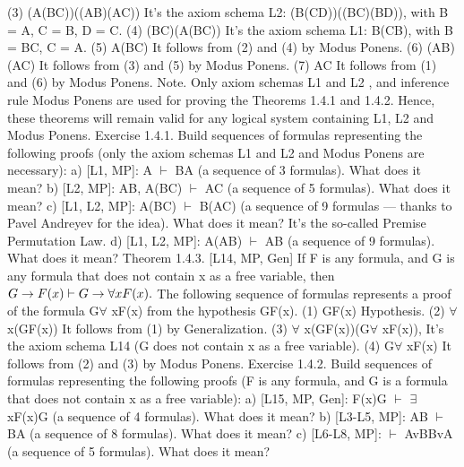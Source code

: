 (3) (A\IMPLIES (B\IMPLIES C))\IMPLIES ((A\IMPLIES B)\IMPLIES (A\IMPLIES C)) It's the axiom schema L2:
                                       (B\IMPLIES (C\IMPLIES D))\IMPLIES ((B\IMPLIES C)\IMPLIES (B\IMPLIES D)), with B =
                                                  A, C = B, D = C.
(4) (B\IMPLIES C)\IMPLIES (A\IMPLIES (B\IMPLIES C)) It's the axiom schema L1: B\IMPLIES (C\IMPLIES B), with B
                               = B\IMPLIES C, C = A.
(5) A\IMPLIES (B\IMPLIES C) It follows from (2) and (4) by Modus Ponens.
(6) (A\IMPLIES B)\IMPLIES (A\IMPLIES C) It follows from (3) and (5) by Modus Ponens.
(7) A\IMPLIES C It follows from (1) and (6) by Modus Ponens.
Note. Only axiom schemas L1 and L2 , and inference rule Modus Ponens are used for proving the
Theorems 1.4.1 and 1.4.2. Hence, these theorems will remain valid for any logical system containing
L1, L2 and Modus Ponens.
Exercise 1.4.1. Build sequences of formulas representing the following proofs (only the axiom schemas
L1 and L2 and Modus Ponens are necessary):
a) [L1, MP]: A \(\vdash\) B\IMPLIES A (a sequence of 3 formulas). What does it mean?
b) [L2, MP]: A\IMPLIES B, A\IMPLIES (B\IMPLIES C) \(\vdash\) A\IMPLIES C (a sequence of 5 formulas). What does it mean?
c) [L1, L2, MP]: A\IMPLIES (B\IMPLIES C) \(\vdash\) B\IMPLIES (A\IMPLIES C) (a sequence of 9 formulas --- thanks to Pavel Andreyev for the
idea). What does it mean? It's the so-called Premise Permutation Law.
d) [L1, L2, MP]: A\IMPLIES (A\IMPLIES B) \(\vdash\) A\IMPLIES B (a sequence of 9 formulas). What does it mean?
Theorem 1.4.3. [L14, MP, Gen] If F is any formula, and G is any formula that does not contain x as a free
variable, then
\(G\rightarrow F(x) \vdash G\rightarrow \forall xF(x).\)
The following sequence of formulas represents a proof of the formula G\IMPLIES \(\forall\) xF(x) from the hypothesis
G\IMPLIES F(x).
(1) G\IMPLIES F(x) Hypothesis.
(2) \(\forall\) x(G\IMPLIES F(x)) It follows from (1) by Generalization.
(3) \(\forall\) x(G\IMPLIES F(x))\IMPLIES (G\IMPLIES \(\forall\) xF(x)), It's the axiom schema L14 (G does not contain x as a free variable).
(4) G\IMPLIES \(\forall\) xF(x) It follows from (2) and (3) by Modus Ponens.
Exercise 1.4.2. Build sequences of formulas representing the following proofs (F is any formula, and G is
a formula that does not contain x as a free variable):
a) [L15, MP, Gen]: F(x)\IMPLIES G \(\vdash\) \(\exists\) xF(x)\IMPLIES G (a sequence of 4 formulas). What does it mean?
b) [L3-L5, MP]: A\AND B \(\vdash\) B\AND A (a sequence of 8 formulas). What does it mean?
c) [L6-L8, MP]: \(\vdash\) AvB\IMPLIES BvA (a sequence of 5 formulas). What does it mean?
